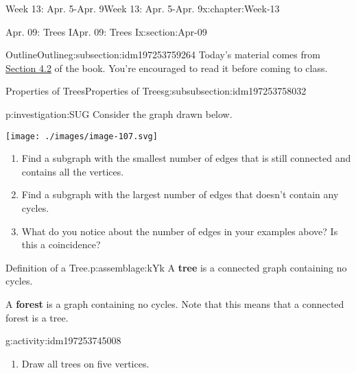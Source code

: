 \documentclass[oneside,10pt,]{book}
\newcommand{\terminology}[1]{\textbf{#1}}
\numberwithin{equation}{section}
\begin{document}
\begin{chapterptx}{Week 13: Apr. 5-Apr. 9}{}{Week 13: Apr. 5-Apr. 9}{}{}{x:chapter:Week-13}
\begin{sectionptx}{Apr. 09: Trees I}{}{Apr. 09: Trees I}{}{}{x:section:Apr-09}
%
%
\typeout{************************************************}
\typeout{************************************************}
%
\begin{subsectionptx}{Outline}{}{Outline}{}{}{g:subsection:idm197253759264}
Today's material comes from \href{http://discrete.openmathbooks.org/dmoi3/sec_trees.html}{Section 4.2} of the book. You're encouraged to read it before coming to class.%
%
%
\typeout{************************************************}
\typeout{************************************************}
%
\begin{subsubsectionptx}{Properties of Trees}{}{Properties of Trees}{}{}{g:subsubsection:idm197253758032}
\begin{investigation}{}{p:investigation:SUG}%
Consider the graph drawn below.%
\begin{sidebyside}{1}{0.325}{0.325}{0}%
\begin{sbspanel}{0.35}%
\texttt{[image: ./images/image-107.svg]}
\end{sbspanel}%
\end{sidebyside}%
\par
%
\begin{enumerate}
\item{}Find a subgraph with the smallest number of edges that is still connected and contains all the vertices.%
\item{}Find a subgraph with the largest number of edges that doesn't contain any cycles.%
\item{}What do you notice about the number of edges in your examples above?  Is this a coincidence?%
\end{enumerate}
%
\end{investigation}%
\begin{assemblage}{Definition of a Tree.}{p:assemblage:kYk}%
A \terminology{tree} is a connected graph containing no cycles.\footnotemark{}%
\par
A \terminology{forest} is a graph containing no cycles.   Note that this means that a connected forest is a tree.%
\end{assemblage}
%
\begin{activity}{}{g:activity:idm197253745008}%
%
\begin{enumerate}
\item{}Draw all trees on five vertices.%

\end{enumerate}
\end{activity}
\end{subsubsectionptx}
\end{subsectionptx}
\end{sectionptx}
\end{chapterptx}
\end{document}
